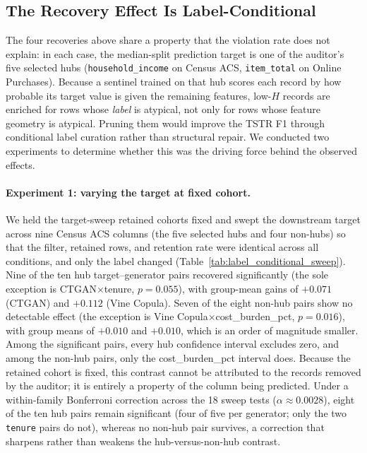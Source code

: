 \documentclass[pdflatex,sn-mathphys-num]{sn-jnl}
\theoremstyle{thmstyleone}%
\theoremstyle{thmstyletwo}%
\theoremstyle{thmstylethree}%
\begin{document}
\subsection{The Recovery Effect Is Label-Conditional}\label{sec:label_conditional}

The four recoveries above share a property that the violation rate does not explain: in each case, the median-split prediction target is one of the auditor's five selected hubs (\texttt{household\_income} on Census ACS, \texttt{item\_total} on Online Purchases). Because a sentinel trained on that hub scores each record by how probable its target value is given the remaining features, low-$H$ records are enriched for rows whose \emph{label} is atypical, not only for rows whose feature geometry is atypical. Pruning them would improve the TSTR F1 through conditional label curation rather than structural repair. We conducted two experiments to determine whether this was the driving force behind the observed effects.

\paragraph{Experiment 1: varying the target at fixed cohort.} We held the target-sweep retained cohorts fixed and swept the downstream target across nine Census ACS columns (the five selected hubs and four non-hubs) so that the filter, retained rows, and retention rate were identical across all conditions, and only the label changed (Table~\ref{tab:label_conditional_sweep}). Nine of the ten hub target--generator pairs recovered significantly (the sole exception is CTGAN$\times$tenure, $p = 0.055$), with group-mean gains of $+0.071$ (CTGAN) and $+0.112$ (Vine Copula). Seven of the eight non-hub pairs show no detectable effect (the exception is Vine Copula$\times$cost\_burden\_pct, $p = 0.016$), with group means of $+0.010$ and $+0.010$, which is an order of magnitude smaller. Among the significant pairs, every hub confidence interval excludes zero, and among the non-hub pairs, only the cost\_burden\_pct interval does. Because the retained cohort is fixed, this contrast cannot be attributed to the records removed by the auditor; it is entirely a property of the column being predicted. Under a within-family Bonferroni correction across the 18 sweep tests ($\alpha \approx 0.0028$), eight of the ten hub pairs remain significant (four of five per generator; only the two \texttt{tenure} pairs do not), whereas no non-hub pair survives, a correction that sharpens rather than weakens the hub-versus-non-hub contrast.
\end{document}
